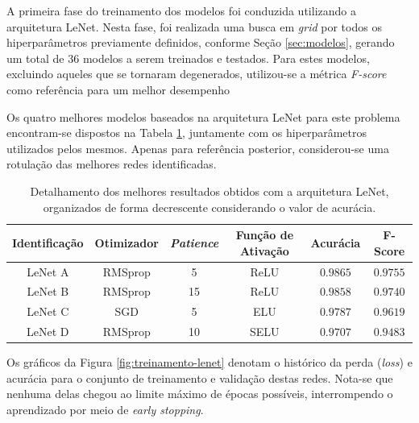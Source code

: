 

A primeira fase do treinamento dos modelos foi conduzida utilizando a arquitetura LeNet. Nesta fase, foi realizada uma busca em \emph{grid} por todos os hiperparâmetros previamente definidos, conforme Seção \ref{sec:modelos}, gerando um total de $36$ modelos a serem treinados e testados. Para estes modelos, excluindo aqueles que se tornaram degenerados, utilizou-se a métrica \emph{F-score} como referência para um melhor desempenho

Os quatro melhores modelos baseados na arquitetura LeNet para este problema encontram-se dispostos na Tabela \ref{tab:lenet}, juntamente com os hiperparâmetros utilizados pelos mesmos. Apenas para referência posterior, considerou-se uma rotulação das melhores redes identificadas.

\begin{table}[h]
\centering
\caption{Detalhamento dos melhores resultados obtidos com a arquitetura LeNet, organizados de forma decrescente considerando o valor de acurácia.}
\label{tab:lenet}
\begin{tabular}{cccccc}
\toprule
\textbf{Identificação} & \textbf{Otimizador} & \textbf{\emph{Patience}}  & \textbf{Função de Ativação} & \textbf{Acurácia} & \textbf{F-Score} \\
\midrule
LeNet A & RMSprop & 5 & ReLU & $0.9865$ & $0.9755$ \\
LeNet B & RMSprop & 15 & ReLU & $0.9858$ & $0.9740$\\
LeNet C & SGD & 5 & ELU & $0.9787$ & $0.9619$ \\
LeNet D & RMSprop & 10 & SELU & $0.9707$ & $0.9483$ \\
\bottomrule
\end{tabular}
\end{table}


Os gráficos da Figura \ref{fig:treinamento-lenet} denotam o histórico da perda (\emph{loss}) e acurácia para o conjunto de treinamento e validação destas redes. Nota-se que nenhuma delas chegou ao limite máximo de épocas possíveis, interrompendo o aprendizado por meio de \emph{early stopping}.

